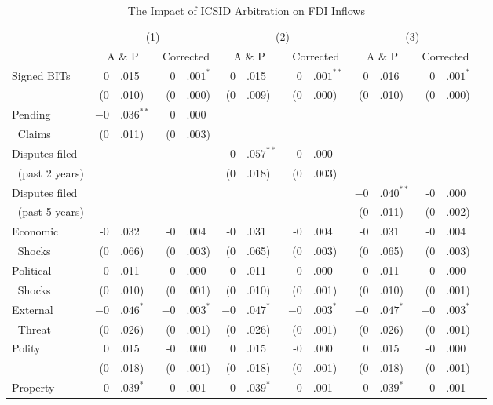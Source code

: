 \documentclass[12pt,onesided]{amsart}
\begin{document}
\begin{table}[ht]
\vspace{1cm}
\centering
{\footnotesize
\caption{The Impact of ICSID Arbitration on FDI Inflows}
\label{tab:allee}
\begin{tabular}{lr@{} lr@{}lr@{}lr@{}lr@{}lr@{}lr@{} }
	\hline\hline
	~ & \multicolumn{4}{c}{(1)} & \multicolumn{4}{c}{(2)} & \multicolumn{4}{c}{(3)} \\	
	~ & \multicolumn{2}{c}{A \& P} & \multicolumn{2}{c}{Corrected} & \multicolumn{2}{c}{A \& P} & \multicolumn{2}{c}{Corrected} & \multicolumn{2}{c}{A \& P} & \multicolumn{2}{c}{Corrected}
	 \\ \hline
	\multirow{2}{*}{Signed BITs} & 0&.015 & $0$&$.001^{\ast}$ & 0&.015 & $0$&$.001^{\ast\ast}$ & 0&.016 & $0$&$.001^{\ast}$ \\
	~ & (0&.010) & (0&.000) & (0&.009) & (0&.000) & (0&.010) & (0&.000) \\
	Pending &$-0$&$.036^{\ast\ast}$ &0&.000 && && && \\
	$\;\;$Claims &(0&.011) &(0&.003) && && && \\
	Disputes filed && && &$-0$&$.057^{\ast\ast}$ &-0&.000 && && \\
	$\;\;$(past 2 years) && && &(0&.018) &(0&.003) && && \\
	Disputes filed && && && && &$-0$&$.040^{\ast\ast}$ &-0&.000 \\
	$\;\;$(past 5 years) && && && && &(0&.011) &(0&.002) \\
	Economic & -0&.032 & -0&.004 & -0&.031 & -0&.004 & -0&.031 & -0&.004 \\
	$\;\;$Shocks & (0&.066) & (0&.003) & (0&.065) & (0&.003) & (0&.065) & (0&.003) \\
	Political & -0&.011 & -0&.000 & -0&.011 & -0&.000 & -0&.011 & -0&.000 \\
	$\;\;$Shocks & (0&.010) & (0&.001) & (0&.010) & (0&.001) & (0&.010) &(0&.001) \\
	External & $-0$&$.046^{\ast}$ & $-0$&$.003^{\ast}$ & $-0$&$.047^{\ast}$ & $-0$&$.003^{\ast}$ & $-0$&$.047^{\ast}$ & $-0$&$.003^{\ast}$ \\
	$\;\;$Threat & (0&.026) & (0&.001) & (0&.026) & (0&.001) & (0&.026) & (0&.001) \\
	\multirow{2}{*}{Polity} & 0&.015 & -0&.000 & 0&.015 & -0&.000 & 0&.015 & -0&.000 \\
	~ & (0&.018) & (0&.001) & (0&.018) & (0&.001) & (0&.018) &(0&.001) \\
	Property & $0$&$.039^{\ast}$ & -0&.001 &  $0$&$.039^{\ast}$ & -0&.001 &  $0$&$.039^{\ast}$ & -0&.001 \\

\end{tabular}}
\end{table}
\end{document}
